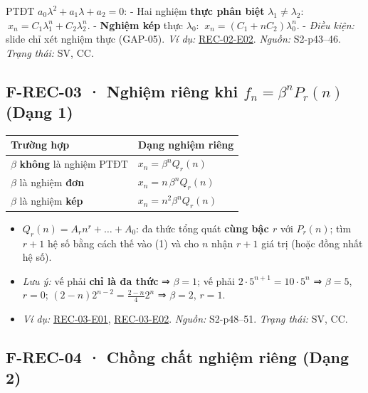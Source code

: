 \documentclass[
  10pt,
  twoside,openany]{book}
\providecommand{\tightlist}{%
  \setlength{\itemsep}{0pt}\setlength{\parskip}{0pt}}
\begin{document}
PTĐT \(a_0\lambda^2+a_1\lambda+a_2=0\): - Hai nghiệm \textbf{thực phân
biệt} \(\lambda_1\ne\lambda_2\):
\(\ x_n=C_1\lambda_1^n+C_2\lambda_2^n\). - \textbf{Nghiệm kép} thực
\(\lambda_0\): \(\ x_n=(C_1+nC_2)\lambda_0^n\). - \emph{Điều kiện:}
slide chỉ xét nghiệm thực (GAP-05). \emph{Ví dụ:}
\protect\hyperlink{REC-02-E02}{REC-02-E02}. \emph{Nguồn:} S2-p43--46.
\emph{Trạng thái:} SV, CC.

\hypertarget{F-REC-03}{%
\subsection{\texorpdfstring{F-REC-03 · Nghiệm riêng khi
\(f_n=\beta^nP_r(n)\) (Dạng
1)}{F-REC-03 · Nghiệm riêng khi f\_n=\textbackslash beta\^{}nP\_r(n) (Dạng 1)}}\label{F-REC-03}}

\begin{longtable}[]{@{}ll@{}}
\toprule\noalign{}
Trường hợp & Dạng nghiệm riêng \\
\midrule\noalign{}
\endhead
\bottomrule\noalign{}
\endlastfoot
\(\beta\) \textbf{không} là nghiệm PTĐT & \(x_n=\beta^nQ_r(n)\) \\
\(\beta\) là nghiệm \textbf{đơn} & \(x_n=n\,\beta^nQ_r(n)\) \\
\(\beta\) là nghiệm \textbf{kép} & \(x_n=n^2\beta^nQ_r(n)\) \\
\end{longtable}

\begin{itemize}
\tightlist
\item
  \(Q_r(n)=A_rn^r+\dots+A_0\): đa thức tổng quát \textbf{cùng bậc \(r\)}
  với \(P_r(n)\); tìm \(r+1\) hệ số bằng cách thế vào (1) và cho \(n\)
  nhận \(r+1\) giá trị (hoặc đồng nhất hệ số).
\item
  \emph{Lưu ý:} vế phải \textbf{chỉ là đa thức} ⇒ \(\beta=1\); vế phải
  \(2\cdot5^{n+1}=10\cdot5^n\) ⇒ \(\beta=5\), \(r=0\);
  \((2-n)2^{n-2}=\frac{2-n}{4}2^n\) ⇒ \(\beta=2\), \(r=1\).
\item
  \emph{Ví dụ:} \protect\hyperlink{REC-03-E01}{REC-03-E01},
  \protect\hyperlink{REC-03-E02}{REC-03-E02}. \emph{Nguồn:} S2-p48--51.
  \emph{Trạng thái:} SV, CC.
\end{itemize}

\hypertarget{F-REC-04}{%
\subsection{F-REC-04 · Chồng chất nghiệm riêng (Dạng
2)}\label{F-REC-04}}
\end{document}
